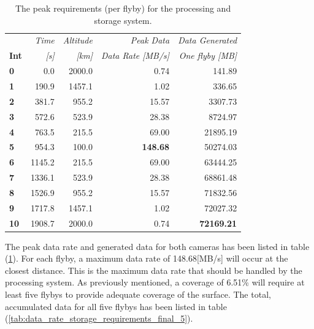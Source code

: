 \begin{table}[htb!]
  \centering
    \begin{tabular}{l|r|r|r|r|}
\textbf{} & \textit{Time} & \textit{Altitude} & \textit{Peak Data} & \multicolumn{1}{r}{\textit{Data Generated}} \\
\textbf{Int} & \textit{[s]} & \textit{[km]} & \textit{Data Rate [MB/s]} & \multicolumn{1}{r}{\textit{One flyby [MB]}} \bigstrut[b]\\
\hline
\textbf{0} & 0.0   & 2000.0 & 0.74  & 141.89 \bigstrut[t]\\
\textbf{1} & 190.9 & 1457.1 & 1.02  & 336.65 \\
\textbf{2} & 381.7 & 955.2 & 15.57 & 3307.73 \\
\textbf{3} & 572.6 & 523.9 & 28.38 & 8724.97 \\
\textbf{4} & 763.5 & 215.5 & 69.00 & 21895.19 \\
\textbf{5} & 954.3 & 100.0 & \textbf{148.68} & 50274.03 \\
\textbf{6} & 1145.2 & 215.5 & 69.00 & 63444.25 \\
\textbf{7} & 1336.1 & 523.9 & 28.38 & 68861.48 \\
\textbf{8} & 1526.9 & 955.2 & 15.57 & 71832.56 \\
\textbf{9} & 1717.8 & 1457.1 & 1.02  & 72027.32 \\
\textbf{10} & 1908.7 & 2000.0 & 0.74  & \textbf{72169.21} \\
\end{tabular}%
        \caption{The peak requirements (per flyby) for the processing and storage system.}
  \label{tab:data_rate_storage_requirements_final}%
\end{table}%
The peak data rate and generated data for both cameras has been listed in table (\ref{tab:data_rate_storage_requirements_final}). For each flyby, a maximum data rate of 148.68[MB/s] will occur at the closest distance. This is the maximum data rate that should be handled by the processing system. 
As previously mentioned, a coverage of 6.51\% will require at least five flybys to provide adequate coverage of the surface. The total, accumulated data for all five flybys has been listed in table (\ref{tab:data_rate_storage_requirements_final_5}).
